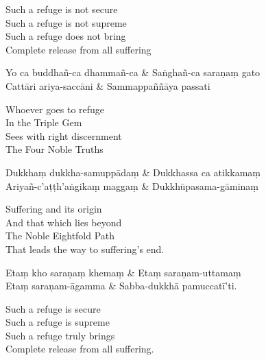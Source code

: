 \begin{english}
  Such a refuge is not secure\\
  Such a refuge is not supreme\\
  Such a refuge does not bring\\
  Complete release from all suffering
\end{english}

\begin{twochants}
Yo ca buddhañ-ca dhammañ-ca & Saṅghañ-ca saraṇaṃ gato\\
Cattāri ariya-saccāni & Sammappaññāya passati\\
\end{twochants}

\begin{english}
  Whoever goes to refuge\\
  In the Triple Gem\\
  Sees with right discernment\\
  The Four Noble Truths
\end{english}

\begin{twochants}
Dukkhaṃ dukkha-samuppādaṃ & Dukkhassa ca atikkamaṃ\\
Ariyañ-c'aṭṭh'aṅgikaṃ maggaṃ & Dukkhūpasama-gāminaṃ\\
\end{twochants}

\begin{english}
  Suffering and its origin\\
  And that which lies beyond\\
  The Noble Eightfold Path\\
  That leads the way to suffering's end.
\end{english}

\begin{twochants}
Etaṃ kho saraṇaṃ khemaṃ & Etaṃ saraṇam-uttamaṃ\\
Etaṃ saraṇam-āgamma & Sabba-dukkhā pamuccatī'ti.
\end{twochants}

\begin{english}
  Such a refuge is secure\\
  Such a refuge is supreme\\
  Such a refuge truly brings\\
  Complete release from all suffering.
\end{english}


